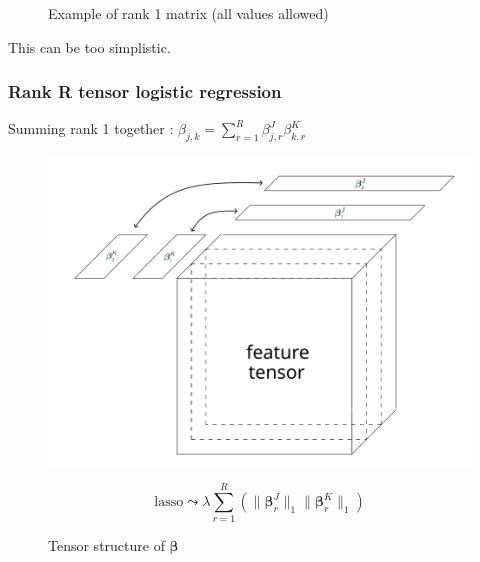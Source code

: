 \documentclass{beamer}
\begin{document}
\begin{frame}
\begin{figure}
\begin{minipage}{0.4\textwidth}
            \caption{\centering Example of rank 1 matrix (all values allowed)}
        \end{minipage}
    \end{figure}
    \begin{center}
        \vspace{5 pt}
        This can be too simplistic.
    \end{center}


\end{frame}

\begin{frame}
    \frametitle{Rank R tensor logistic regression \cite{multi_rank_r}}
    \hspace{50 pt}Summing rank 1 together : $\beta_{j,k} = \sum\limits_{r = 1}^R \beta_{j,r}^J\beta_{k,r}^K$\\
    \vspace{-10 pt}
\begin{figure}
    \centering
    \begin{minipage}{0.5\textwidth}
        \centering
        \includegraphics[scale=0.25]{images/beta_tens_R.png}
        \caption{Tensor structure of $\bm{\beta}$}
    \end{minipage}
    \hfill
    \begin{minipage}{0.45\textwidth}
        \centering
        \[
        \text{lasso} \leadsto  \lambda \sum\limits_{r = 1}^R \left( \lVert \bm{\beta}_r^J \rVert_1 \lVert \bm{\beta}_r^K \rVert_1 \right)
        \]
    \end{minipage}
\end{figure}
\end{frame}
\end{document}
